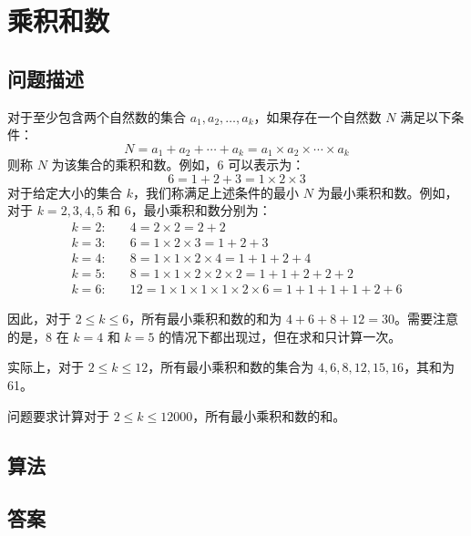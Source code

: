 \section{乘积和数}\label{sec:problem88}
\subsection{问题描述}
\begin{tcolorbox}
	对于至少包含两个自然数的集合 ${a_1, a_2, \ldots, a_k}$，如果存在一个自然数 $N$ 满足以下条件：
	\begin{equation*}
		N = a_1 + a_2 + \cdots + a_k = a_1 \times a_2 \times \cdots \times a_k
	\end{equation*}
	则称 $N$ 为该集合的乘积和数。例如，6 可以表示为：
	\begin{equation*}
		6 = 1 + 2 + 3 = 1 \times 2 \times 3
	\end{equation*}
	对于给定大小的集合 $k$，我们称满足上述条件的最小 $N$ 为最小乘积和数。例如，对于 $k = 2, 3, 4, 5$ 和 $6$，最小乘积和数分别为：
	\begin{align*}
		k = 2: & \quad 4 = 2 \times 2 = 2 + 2                                                      \\
		k = 3: & \quad 6 = 1 \times 2 \times 3 = 1 + 2 + 3                                         \\
		k = 4: & \quad 8 = 1 \times 1 \times 2 \times 4 = 1 + 1 + 2 + 4                            \\
		k = 5: & \quad 8 = 1 \times 1 \times 2 \times 2 \times 2 = 1 + 1 + 2 + 2 + 2               \\
		k = 6: & \quad 12 = 1 \times 1 \times 1 \times 1 \times 2 \times 6 = 1 + 1 + 1 + 1 + 2 + 6
	\end{align*}

	因此，对于 $2 \leqslant k \leqslant 6$，所有最小乘积和数的和为 $4 + 6 + 8 + 12 = 30$。需要注意的是，8 在 $k = 4$ 和 $k = 5$ 的情况下都出现过，但在求和只计算一次。

	实际上，对于 $2 \leqslant k \leqslant 12$，所有最小乘积和数的集合为 ${4, 6, 8, 12, 15, 16}$，其和为 61。

	问题要求计算对于 $2 \leqslant k \leqslant 12000$，所有最小乘积和数的和。
\end{tcolorbox}

\subsection{算法}

\subsection{答案}

